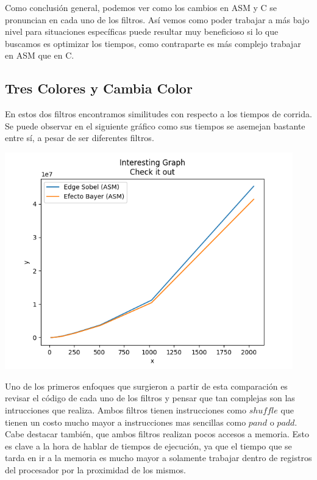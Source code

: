 Como conclusión general, podemos ver como los cambios en ASM y C se pronuncian en cada uno de los filtros. Así vemos como poder trabajar a más bajo nivel para situaciones específicas puede resultar muy beneficioso si lo que buscamos es optimizar los tiempos, como contraparte es más complejo trabajar en ASM que en C.


\subsection{Tres Colores y Cambia Color}

En estos dos filtros encontramos similitudes con respecto a los tiempos de corrida. 
Se puede observar en el siguiente gráfico como sus tiempos se asemejan bastante entre sí, a pesar de ser diferentes filtros. 

\vspace{6px}
\begin{center}
\includegraphics[width=12.5cm, height=9
cm]{images/cambia_tres.png}
\end{center}
\vspace{6px}


Uno de los primeros enfoques que surgieron a partir de esta comparación es revisar el código de cada uno de los filtros y pensar que tan complejas son las intrucciones que realiza. 
Ambos filtros tienen instrucciones como $shuffle$ que tienen un costo mucho mayor a instrucciones mas sencillas como $pand$ o $padd$. Cabe destacar también, que ambos filtros realizan pocos accesos a memoria. Esto es clave a la hora de hablar de tiempos de ejecución, ya que el tiempo que se tarda en ir a la memoria es mucho mayor a solamente trabajar dentro de registros del procesador por la proximidad de los mismos. 



